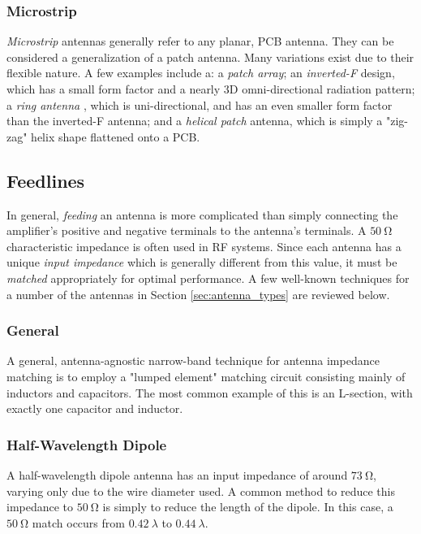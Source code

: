 \subsubsection{Microstrip}
\textit{Microstrip} antennas generally refer to any planar, PCB antenna. They can be considered a generalization of a patch antenna. Many variations exist due to their flexible nature. A few examples include a: a \textit{patch array}; an \textit{inverted-F} design, which has a small form factor and a nearly 3D omni-directional radiation pattern; a \textit{ring antenna} \cite{paper-lowProfileRingAntenna}, which is uni-directional, and has an even smaller form factor than the inverted-F antenna; and a \textit{helical patch} antenna, which is simply a "zig-zag" helix shape flattened onto a PCB.

\subsection{Feedlines}
In general, \textit{feeding} an antenna is more complicated than simply connecting the amplifier's positive and negative terminals to the antenna's terminals. A $\SI{50}{\ohm}$ characteristic impedance is often used in RF systems. Since each antenna has a unique \textit{input impedance} which is generally different from this value, it must be \textit{matched} appropriately for optimal performance. A few well-known techniques for a number of the antennas in Section \ref{sec:antenna_types} are reviewed below.

\subsubsection{General}
A general, antenna-agnostic narrow-band technique for antenna impedance matching is to employ a "lumped element" matching circuit consisting mainly of inductors and capacitors. The most common example of this is an L-section, with exactly one capacitor and inductor.

\subsubsection{Half-Wavelength Dipole}
A half-wavelength dipole antenna has an input impedance of around $\SI{73}{\ohm}$, varying only due to the wire diameter used. A common method to reduce this impedance to $\SI{50}{\ohm}$ is simply to reduce the length of the dipole. In this case, a $\SI{50}{\ohm}$ match occurs from $\SI{0.42}{\lambda}$ to $\SI{0.44}{\lambda}$. \cite{textbook-antennaTheoryAnalysisDesign}

